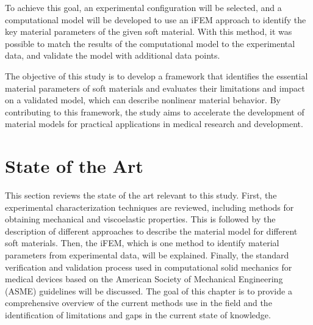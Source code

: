 To achieve this goal, an experimental configuration will be selected, and a computational model will be 
developed to use an iFEM approach to identify the key material parameters of the given soft material. 
With this method, it was possible to match the results of the computational model to the experimental 
data, and validate the model with additional data points. 

The objective of this study is to develop a framework that identifies the essential material parameters of soft materials 
and evaluates their limitations and impact on a validated model, which can describe nonlinear material behavior.
By contributing to this framework, the study aims to accelerate the development of material models for practical 
applications in medical research and development.
\section{State of the Art}

This section reviews the state of the art relevant to this study. First, the experimental characterization 
techniques are reviewed, including methods for obtaining mechanical and viscoelastic properties.
This is followed by the description of different approaches to describe the material model for different soft 
materials. Then, the iFEM, which is one method to identify material parameters from experimental data, 
will be explained. Finally, the standard verification and validation process used in computational 
solid mechanics for medical devices based on the American Society of Mechanical Engineering (ASME) guidelines 
will be discussed. The goal of this chapter is to provide a comprehensive overview of the current methods use in 
the field and the identification of limitations and gaps in the current state of knowledge. %

